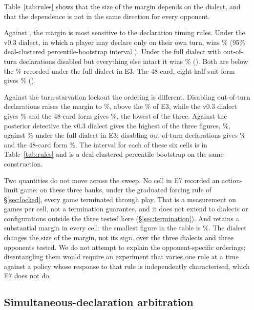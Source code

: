 Table~\ref{tab:rules} shows that the size of the margin depends on the dialect,
and that the dependence is not in the same direction for every opponent.

Against \vthree{}, the margin is most sensitive to the declaration timing rules.
Under the v0.3 dialect, in which a player may declare only on their own turn,
\vfast{} wins \numEsevenVthreeLegacy\% (95\% deal-clustered percentile-bootstrap
interval \numEsevenVthreeLegacyCI). Under the full dialect with out-of-turn
declarations disabled but everything else intact it wins
\numEsevenVthreeNoOOT\% (\numEsevenVthreeNoOOTCI). Both are below the
\numVsVthree\% recorded under the full dialect in E3. The 48-card,
eight-half-suit form gives \numEsevenVthreeEight\% (\numEsevenVthreeEightCI).

Against the turn-starvation lockout the ordering is different. Disabling
out-of-turn declarations raises the margin to \numEsevenLockoutNoOOT\%, above
the \numVsLockout\% of E3, while the v0.3 dialect gives
\numEsevenLockoutLegacy\% and the 48-card form gives \numEsevenLockoutEight\%,
the lowest of the three. Against the posterior detective the v0.3 dialect gives
the highest of the three figures, \numEsevenDetectiveLegacy\%, against
\numVsDetective\% under the full dialect in E3; disabling out-of-turn
declarations gives \numEsevenDetectiveNoOOT\% and the 48-card form
\numEsevenDetectiveEight\%. The interval for each of these six cells is in
Table~\ref{tab:rules} and is a deal-clustered percentile bootstrap on the same
construction.

Two quantities do not move across the sweep. No cell in E7 recorded an
action-limit game: on these three banks, under the graduated forcing rule of
\S\ref{sec:locked}, every game terminated through play. That is a measurement on
\numEsevenGames{} games per cell, not a termination guarantee, and it does not
extend to dialects or configurations outside the three tested here
(\S\ref{sec:termination}). And \vfast{} retains a substantial margin in every
cell: the smallest figure in the table is \numEsevenVthreeLegacy\%. The dialect
changes the size of the margin, not its sign, over the three dialects and three
opponents tested. We do not attempt to explain the opponent-specific orderings;
disentangling them would require an experiment that varies one rule at a time
against a policy whose response to that rule is independently characterised,
which E7 does not do.

\subsection{Simultaneous-declaration arbitration}
\label{app:dialects-arb}

